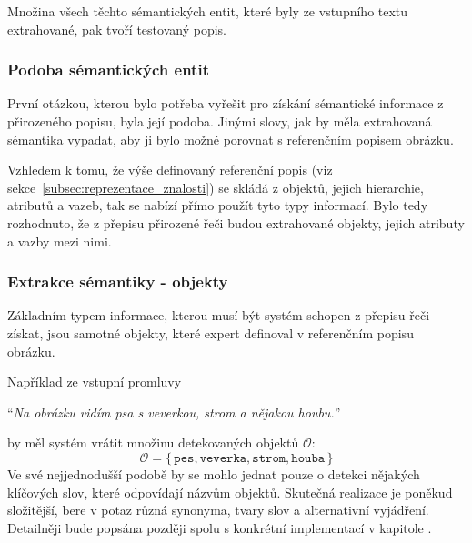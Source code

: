 Množina všech těchto sémantických entit, které byly ze vstupního textu extrahované, pak tvoří testovaný popis.



\subsubsection{Podoba sémantických entit}
První otázkou, kterou bylo potřeba vyřešit pro získání sémantické informace z přirozeného popisu, byla její podoba.
Jinými slovy, jak by měla extrahovaná sémantika vypadat, aby ji bylo možné porovnat s referenčním popisem obrázku.

Vzhledem k tomu, že výše definovaný referenční popis (viz sekce~\ref{subsec:reprezentace_znalosti}) se skládá z objektů, jejich hierarchie, atributů a vazeb,
tak se nabízí přímo použít tyto typy informací.
Bylo tedy rozhodnuto, že z přepisu přirozené řeči budou extrahované objekty, jejich atributy a vazby mezi nimi.

\subsubsection{Extrakce sémantiky - objekty}
Základním typem informace, kterou musí být systém schopen z přepisu řeči získat, jsou samotné objekty, které expert definoval v referenčním popisu obrázku.

Například ze vstupní promluvy
\begin{center}
	\enquote{\emph{Na obrázku vidím psa s veverkou, strom a nějakou houbu.}}
\end{center}
by měl systém vrátit množinu detekovaných objektů $\mathcal{O}$:
\[
	\mathcal O = \bigl\{\, \texttt{pes}, \texttt{veverka}, \texttt{strom}, \texttt{houba}\, \bigr\}
\]
Ve své nejjednodušší podobě by se mohlo jednat pouze o detekci nějakých klíčových slov, které odpovídají názvům objektů.
Skutečná realizace je poněkud složitější, bere v potaz různá synonyma, tvary slov a alternativní vyjádření.
Detailněji bude popsána později spolu s konkrétní implementací v kapitole
.

